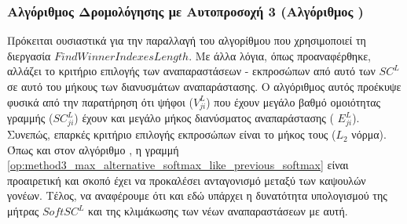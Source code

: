 \subsubsection{Αλγόριθμος Δρομολόγησης με Αυτο\textendash προσοχή 3 (Αλγόριθμος )}
Πρόκειται ουσιαστικά για την παραλλαγή του αλγορίθμου  που χρησιμοποιεί τη διεργασία $FindWinnerIndexesLength$. Με άλλα λόγια, όπως προαναφέρθηκε, αλλάζει το κριτήριο επιλογής των αναπαραστάσεων - εκπροσώπων από αυτό των $SC^L$ σε αυτό του μήκους των διανυσμάτων αναπαράστασης. Ο αλγόριθμος αυτός προέκυψε φυσικά από την παρατήρηση ότι ψήφοι ($V^L_{ji}$) που έχουν μεγάλο βαθμό ομοιότητας γραμμής ($SC^L_{ji}$) έχουν και μεγάλο μήκος διανύσματος αναπαράστασης ( $E^L_{ji}$). Συνεπώς, επαρκές κριτήριο επιλογής εκπροσώπων είναι το μήκος τους ($L_2$ νόρμα). Όπως και στον αλγόριθμο , η γραμμή \ref{op:method3_max_alternative_softmax_like_previous_softmax} είναι προαιρετική και σκοπό έχει να προκαλέσει ανταγονισμό μεταξύ των καψουλών γονέων. Τέλος, να αναφέρουμε ότι και εδώ υπάρχει η δυνατότητα υπολογισμού της μήτρας $SoftSC^L$ και της κλιμάκωσης των νέων αναπαραστάσεων με αυτή.


